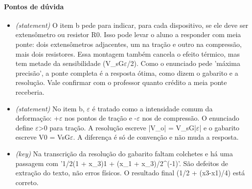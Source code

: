 \documentclass{article}%
\begin{document}
\paragraph{Pontos de dúvida}%
\begin{itemize}%
\item%
\textit{(statement)} O item b pede para indicar, para cada dispositivo, se ele deve ser extensômetro ou resistor R0. Isso pode levar o aluno a responder com meia ponte: dois extensômetros adjacentes, um na tração e outro na compressão, mais dois resistores. Essa montagem também cancela o efeito térmico, mas tem metade da sensibilidade (V\_sG$\varepsilon$/2). Como o enunciado pede 'máxima precisão', a ponte completa é a resposta ótima, como dizem o gabarito e a resolução. Vale confirmar com o professor quanto crédito a meia ponte receberia.%
\item%
\textit{(statement)} No item b, $\varepsilon$ é tratado como a intensidade comum da deformação: +$\varepsilon$ nos pontos de tração e -$\varepsilon$ nos de compressão. O enunciado define $\varepsilon$>0 para tração. A resolução escreve |V\_o| = V\_sG|$\varepsilon$| e o gabarito escreve V0 = VsG$\varepsilon$. A diferença é só de convenção e não muda a resposta.%
\item%
\textit{(key)} Na transcrição da resolução do gabarito faltam colchetes e há uma passagem com '1/2(1 + x\_3)1 + (x\_1 + x\_3)/2\^{}({-}1)'. São defeitos de extração do texto, não erros físicos. O resultado final (1/2 + (x3-x1)/4) está correto.%
\end{itemize}%
\end{document}
